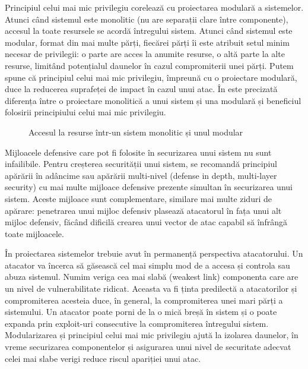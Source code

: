 Principiul celui mai mic privilegiu corelează cu proiectarea modulară a sistemelor. Atunci când sistemul este monolitic (nu are separații clare între componente), accesul la toate resursele se acordă întregului sistem. Atunci când sistemul este modular, format din mai multe părți, fiecărei părți îi este atribuit setul minim necesar de privilegii: o parte are acces la anumite resurse, o altă parte la alte resurse, limitând potențialul daunelor în cazul compromiterii unei părți. Putem spune că principiul celui mai mic privilegiu, împreună cu o proiectare modulară, duce la reducerea suprafeței de impact în cazul unui atac. În  este precizată diferența între o proiectare monolitică a unui sistem și una modulară și beneficiul folosirii principiului celui mai mic privilegiu.

\begin{figure}[htbp]
  \centering
  \def\svgwidth{\columnwidth}
  
  \caption{Accesul la resurse într-un sistem monolitic și unul modular}
  \label{fig:sec:resource-access}
\end{figure}

Mijloacele defensive care pot fi folosite în securizarea unui sistem nu sunt infailibile. Pentru creșterea securității unui sistem, se recomandă principiul apărării în adâncime sau apărării multi-nivel (defense in depth, multi-layer security) cu mai multe mijloace defensive prezente simultan în securizarea unui sistem. Aceste mijloace sunt complementare, similare mai multe ziduri de apărare: penetrarea unui mijloc defensiv plasează atacatorul în fața unui alt mijloc defensiv, făcând dificilă crearea unui vector de atac capabil să înfrângă toate mijloacele.

În proiectarea sistemelor trebuie avut în permanență perspectiva atacatorului. Un atacator va încerca să găsească cel mai simplu mod de a accesa și controla sau abuza sistemul. Numim veriga cea mai slabă (weakest link) componenta care are un nivel de vulnerabilitate ridicat. Aceasta va fi ținta predilectă a atacatorilor și compromiterea acesteia duce, în general, la compromiterea unei mari părți a sistemului. Un atacator poate porni de la o mică breșă în sistem și o poate expanda prin exploit-uri consecutive la compromiterea întregului sistem. Modularizarea și principiul celui mai mic privilegiu ajută la izolarea daunelor, în vreme securizarea componentelor și asigurarea unui nivel de securitate adecvat celei mai slabe verigi reduce riscul apariției unui atac.

